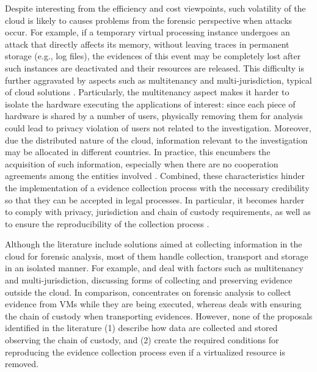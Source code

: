 \documentclass[conference]{IEEEtran}
\begin{document}
%
Despite interesting from the efficiency and cost viewpoints, such volatility of the cloud is likely to causes problems from the forensic perspective when attacks occur.
%
For example, if a temporary virtual processing instance undergoes an attack that directly affects its memory, without leaving traces in permanent storage (e.g., log files), the evidences of this event may be completely lost after such instances are deactivated and their resources are released.
%
This difficulty is further aggravated by aspects such as multitenancy and multi-jurisdiction, typical of cloud solutions \cite{Bash_Adv_in_Forensics:2015}.
%
Particularly, the multitenancy aspect makes it harder to isolate the hardware executing the applications of interest: since each piece of hardware is shared by a number of users, physically removing them for analysis could lead to privacy violation of users not related to the investigation. 
%
Moreover, due the distributed nature of the cloud, information relevant to the investigation may be allocated in different countries.
%
In practice, this encumbers the acquisition of such information, especially when there are no cooperation agreements among the entities involved \cite{Dykstra_Acquiring_for_IAAS:2012}.
%
%
Combined, these characteristics hinder the implementation of a evidence collection process with the necessary credibility so that they can be accepted in legal processes.
%
In particular, it becomes harder to comply with privacy, jurisdiction and chain of custody requirements, as well as to ensure the reproducibility of the collection process \cite{Rahman_Live_Forensics_Techniques:2015}.


%
Although the literature include solutions aimed at collecting information in the cloud for forensic analysis, most of them handle collection, transport and storage in an isolated manner.
%
For example, \cite{Dykstra_FROST:2013} and \cite{Reichert_Auto_acquisition:2015} deal with factors such as multitenancy and multi-jurisdiction, discussing forms of collecting and preserving evidence outside the cloud.
%
In comparison, \cite{George_DF2CE:2012} concentrates on forensic analysis to collect evidence from VMs while they are being executed, whereas \cite{Sang_Log_approach:2013} deals with ensuring the chain of custody when transporting evidences.
%
However, none of the proposals identified in the literature (1) describe how data are collected and stored observing the chain of custody, and (2) create the required conditions for reproducing the evidence collection process even if a virtualized resource is removed.
\end{document}
